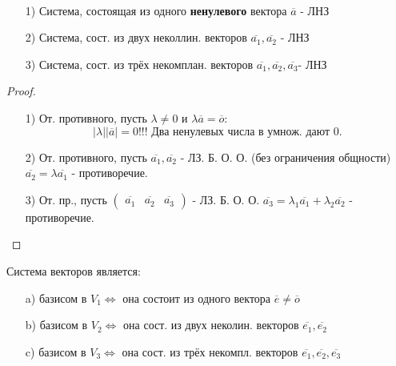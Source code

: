 \begin{theorem}
    ~\newline
\begin{enumerate}
    \item [1) ] Система, состоящая из одного \textbf{ненулевого} вектора $\overline{a}$ - ЛНЗ
    \item [2) ] Система, сост. из двух неколлин. векторов $\overline{a_1}, \overline{a_2}$ - ЛНЗ
    \item [3) ] Система, сост. из трёх некомплан. векторов $\overline{a_1}, \overline{a_2}, \overline{a_3}$- ЛНЗ
\end{enumerate}
\end{theorem}
\begin{proof}
    \begin{enumerate}
        \item [1) ] От. противного, пусть $\lambda \neq 0$ и $\lambda \overline{a} = \overline{o}$:
            \[
            |\lambda||\overline{a}| = 0 \text{!!! Два ненулевых числа в умнож. дают 0.}
            \] 
        \item [2) ] От. противного, пусть $\overline{a_1}, \overline{a_2}$ - ЛЗ. Б. О. О. (без ограничения общности) $\overline{a_2} = \lambda \overline{a_1}$ - противоречие.
        \item [3) ] От. пр., пусть $\begin{pmatrix}\overline{a_1} & \overline{a_2} & \overline{a_3} \end{pmatrix}$ - ЛЗ. Б. О. О. $\overline{a_3} = \lambda_1 \overline{a_1} + \lambda_2 \overline{a_2}$ - противоречие.
    \end{enumerate}
\end{proof}
\begin{theorem}
Система векторов является:
\begin{itemize}
    \item [a) ] базисом в $V_1 \iff $ она состоит из одного вектора $\overline{e} \neq \overline{o}$
    \item [b) ] базисом в $V_2 \iff$ она сост. из двух неколин. векторов $\overline{e_1}, \overline{e_2}$
    \item [c) ] базисом в $V_3 \iff$ она сост. из трёх некомпл. векторов $\overline{e_1}, \overline{e_2}, \overline{e_3}$
\end{itemize}
\end{theorem}
